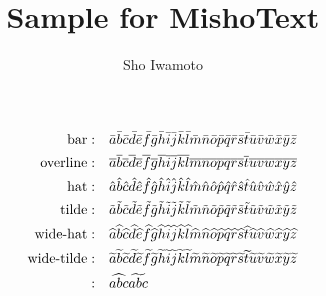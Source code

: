\documentclass[11pt]{MishoText}
\title{Sample for MishoText}
\author{Sho Iwamoto}
\begin{document}
\begin{align*}
\text{bar}:&\quad\let\Q\bar      \Q a\Q b\Q c\Q d\Q e\Q f\Q g\Q h\Q i\Q j\Q k\Q l\Q m\Q n\Q o\Q p\Q q\Q r\Q s\Q t\Q u\Q v\Q w\Q x\Q y\Q z\\
\text{overline}:&\quad\let\Q\overline \Q a\Q b\Q c\Q d\Q e\Q f\Q g\Q h\Q i\Q j\Q k\Q l\Q m\Q n\Q o\Q p\Q q\Q r\Q s\Q t\Q u\Q v\Q w\Q x\Q y\Q z\\
\text{hat}:&\quad\let\Q\hat      \Q a\Q b\Q c\Q d\Q e\Q f\Q g\Q h\Q i\Q j\Q k\Q l\Q m\Q n\Q o\Q p\Q q\Q r\Q s\Q t\Q u\Q v\Q w\Q x\Q y\Q z\\
\text{tilde}:&\quad\let\Q\tilde    \Q a\Q b\Q c\Q d\Q e\Q f\Q g\Q h\Q i\Q j\Q k\Q l\Q m\Q n\Q o\Q p\Q q\Q r\Q s\Q t\Q u\Q v\Q w\Q x\Q y\Q z\\
\text{wide-hat}:&\quad\let\Q\widehat  \Q a\Q b\Q c\Q d\Q e\Q f\Q g\Q h\Q i\Q j\Q k\Q l\Q m\Q n\Q o\Q p\Q q\Q r\Q s\Q t\Q u\Q v\Q w\Q x\Q y\Q z\\
\text{wide-tilde}:&\quad\let\Q\widetilde\Q a\Q b\Q c\Q d\Q e\Q f\Q g\Q h\Q i\Q j\Q k\Q l\Q m\Q n\Q o\Q p\Q q\Q r\Q s\Q t\Q u\Q v\Q w\Q x\Q y\Q z\\
\text{}:&\quad\widehat{abc}\widetilde{abc}
\end{align*}
\end{document}
